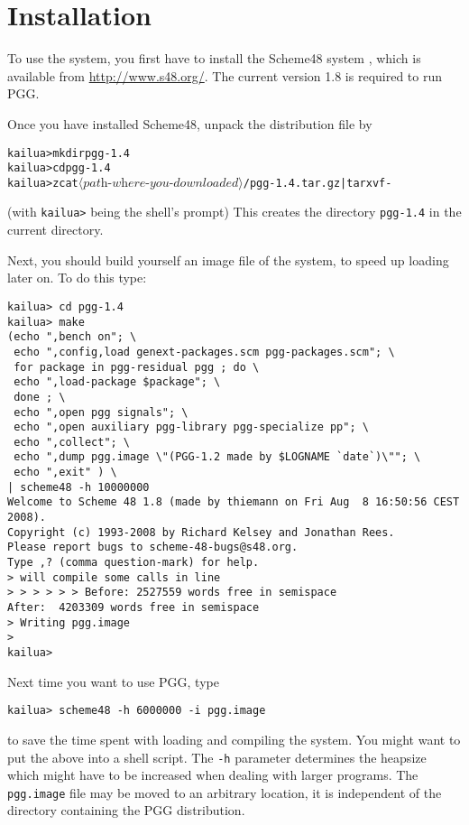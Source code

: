 \documentclass[11pt]{article}
\makeatletter
\newcommand{\dindextt}[1]{\index{#1@\texttt{#1}|textbf}}
\newcommand{\meta}[1]{\ensuremath{\langle\textit{#1}\rangle}}
\makeatother
\begin{document}
\section{Installation}
\label{sec:installation}

To use the system, you first have to install the Scheme48 system
\cite{KelseyRees1995}, which is available from 
\url{http://www.s48.org/}. The current version 1.8 is required to run PGG.

Once you have installed Scheme48, unpack the distribution file by 
\begin{alltt}
kailua> mkdir pgg-1.4
kailua> cd pgg-1.4 
kailua> zcat \meta{path-where-you-downloaded}/pgg-1.4.tar.gz | tar xvf -
\end{alltt}
(with \verb+kailua>+ being the shell's prompt)
This creates the directory \texttt{pgg-1.4} in the current directory.

Next, you should build yourself an image file of the system, to speed
up loading later on. To do this type:
\begin{verbatim}
kailua> cd pgg-1.4
kailua> make
(echo ",bench on"; \
 echo ",config,load genext-packages.scm pgg-packages.scm"; \
 for package in pgg-residual pgg ; do \
 echo ",load-package $package"; \
 done ; \
 echo ",open pgg signals"; \
 echo ",open auxiliary pgg-library pgg-specialize pp"; \
 echo ",collect"; \
 echo ",dump pgg.image \"(PGG-1.2 made by $LOGNAME `date`)\""; \
 echo ",exit" ) \
| scheme48 -h 10000000
Welcome to Scheme 48 1.8 (made by thiemann on Fri Aug  8 16:50:56 CEST 2008).
Copyright (c) 1993-2008 by Richard Kelsey and Jonathan Rees.
Please report bugs to scheme-48-bugs@s48.org.
Type ,? (comma question-mark) for help.
> will compile some calls in line
> > > > > > Before: 2527559 words free in semispace
After:  4203309 words free in semispace
> Writing pgg.image
> 
kailua>
\end{verbatim}

Next time you want to use PGG, type
\begin{verbatim}
kailua> scheme48 -h 6000000 -i pgg.image
\end{verbatim}
to save the time spent with loading and compiling the system. You
might want to put the above into a shell script. The \texttt{-h}
parameter determines the heapsize which might have to
be increased when dealing with larger programs. The
\texttt{pgg.image}\dindextt{pgg.image} file may be 
moved to an arbitrary location, it is independent of the directory
containing the PGG distribution.
\end{document}
